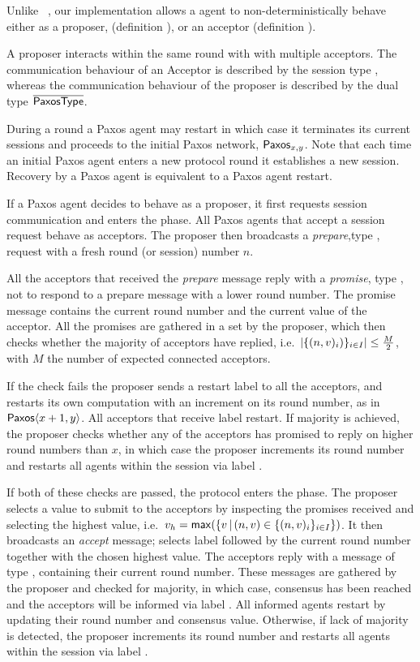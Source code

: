Unlike ~\cite{lamport2001paxos}, our implementation allows a agent to non-deterministically behave either as a proposer,
(definition ), or an acceptor
(definition ).

A proposer interacts within the same round with with multiple acceptors.
The communication behaviour of an Acceptor is described by the
session type \PaxosType, whereas the communication behaviour of the
proposer is described by the dual type $\overline{\mathsf{PaxosType}}$.

During a round a Paxos agent may restart in which case it terminates its
current sessions and proceeds to the initial Paxos network,
$\mathsf{Paxos}_{x, y}$. Note that each time an initial Paxos agent enters
a new protocol round it establishes a new session.
Recovery by a Paxos agent is equivalent to a Paxos agent restart.

If a Paxos agent decides to behave as a proposer, it first requests
session communication and enters the \PreparePh phase. All Paxos
agents that accept a session request behave as acceptors.
%
The proposer then broadcasts a \textit{prepare},type \prep, request
with a fresh round (or session) number $n$.

All the acceptors that received the \textit{prepare} message reply
with a \textit{promise}, type \prom, not to respond to a prepare
message with a lower round number.
%
The promise message contains the current round number and the current
value of the acceptor. All the promises are gathered in a set by the
proposer, which then checks whether the majority of acceptors
have replied, i.e.\  $|\{(n, v)_i)\}_{i \in I}| \leq \frac{M}{2}$,
with $M$ the number of expected connected acceptors.

If the check fails the proposer sends a restart label to all the
acceptors, and restarts its own computation with an increment on its
round number, as in $\mathsf{Paxos}\langle x + 1, y\rangle$. All acceptors that receive
label \restart restart.
%
If majority is achieved, the proposer checks whether any of the acceptors
has promised to reply on higher round numbers than $x$, in which case the
proposer increments its round number and restarts all agents within the
session via label \restart.

If both of these checks are passed, the protocol enters the \AcceptPh
phase. The proposer selects a value to submit to the acceptors
by inspecting the promises received and selecting the highest value,
i.e.~$v_h = \mathsf{max}(\{v \,|\, (n, v) \in \{(n, v)_i\}_{i \in I}\})$.
%
It then broadcasts an \textit{accept} message; selects label \acceptPhase
followed by the current round number together with the chosen highest value.
%
The acceptors reply with a message of type \rnumber, containing
their current round number. These messages are gathered by the
proposer and checked for majority,
in which case, consensus has been reached and the acceptors will
be informed via label \chosen. All informed agents
restart by updating their round number and consensus value.
Otherwise, if lack of majority is detected, the proposer increments
its round number and restarts all agents within the session via
label \restart.

